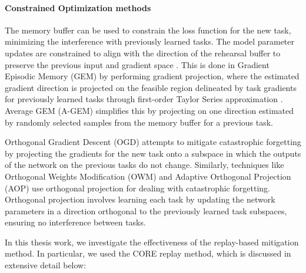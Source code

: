 \paragraph{Constrained Optimization methods} The memory buffer can be used to constrain the loss function for the new task, minimizing the interference with previously learned tasks. The model parameter updates are constrained to align with the direction of the rehearsal buffer to preserve the previous input and gradient space \cite{de2021continual}. This is done in Gradient Episodic Memory (GEM) \cite{lopez2017gradient} by performing gradient projection, where the estimated gradient direction is projected on the feasible region delineated by task gradients for previously learned tasks through first-order Taylor Series approximation \cite{wang2024comprehensive}. Average GEM (A-GEM) \cite{chaudhry2018efficient} simplifies this by projecting on one direction estimated by randomly selected samples from the memory buffer for a previous task. 

Orthogonal Gradient Descent (OGD) \cite{farajtabar2020orthogonal} attempts to mitigate catastrophic forgetting by projecting the gradients for the new task onto a subspace in which the outputs of the network on the previous tasks do not change. Similarly, techniques like Orthogonal Weights Modification (OWM) \cite{zeng2019continual} and Adaptive Orthogonal Projection (AOP) \cite{guo2022adaptive} use orthogonal projection for dealing with catastrophic forgetting. Orthogonal projection involves learning each task by updating the network parameters in a direction orthogonal to the previously learned task subspaces, ensuring no interference between tasks.

In this thesis work, we investigate the effectiveness of the replay-based mitigation method. In particular, we used the CORE \cite{zhang2024core} replay method, which is discussed in extensive detail below:
